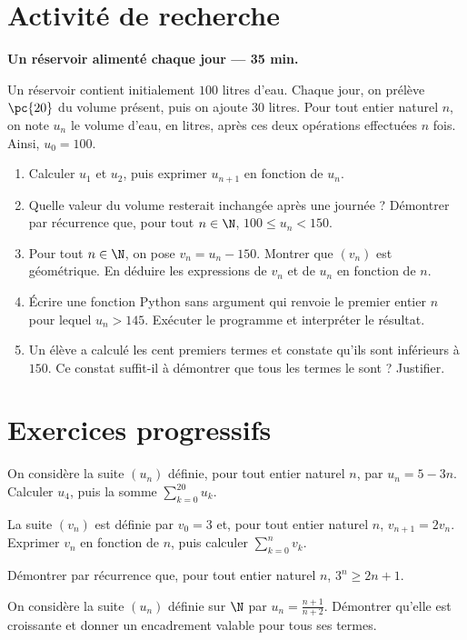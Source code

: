 \section{Activité de recherche}\textbf{Un réservoir alimenté chaque jour --- 35 min.}\par Un réservoir contient initialement $100$ litres d'eau. Chaque jour, on prélève $\pc{20}$ du volume présent, puis on ajoute $30$ litres. Pour tout entier naturel $n$, on note $u_n$ le volume d'eau, en litres, après ces deux opérations effectuées $n$ fois. Ainsi, $u_0=100$.
\begin{enumerate}\item Calculer $u_1$ et $u_2$, puis exprimer $u_{n+1}$ en fonction de $u_n$.
\item Quelle valeur du volume resterait inchangée après une journée ? Démontrer par récurrence que, pour tout $n\in\N$, $100\le u_n<150$.
\item Pour tout $n\in\N$, on pose $v_n=u_n-150$. Montrer que $(v_n)$ est géométrique. En déduire les expressions de $v_n$ et de $u_n$ en fonction de $n$.
\item Écrire une fonction Python sans argument qui renvoie le premier entier $n$ pour lequel $u_n>145$. Exécuter le programme et interpréter le résultat.
\item Un élève a calculé les cent premiers termes et constate qu'ils sont inférieurs à $150$. Ce constat suffit-il à démontrer que tous les termes le sont ? Justifier.\end{enumerate}

\mxnewpage
\section{Exercices progressifs}

On considère la suite $(u_n)$ définie, pour tout entier naturel $n$, par $u_n=5-3n$. Calculer $u_4$, puis la somme $\displaystyle\sum_{k=0}^{20}u_k$.

La suite $(v_n)$ est définie par $v_0=3$ et, pour tout entier naturel $n$, $v_{n+1}=2v_n$. Exprimer $v_n$ en fonction de $n$, puis calculer $\displaystyle\sum_{k=0}^n v_k$.

Démontrer par récurrence que, pour tout entier naturel $n$, $3^n\ge2n+1$.

On considère la suite $(u_n)$ définie sur $\N$ par $u_n=\frac{n+1}{n+2}$. Démontrer qu'elle est croissante et donner un encadrement valable pour tous ses termes.

